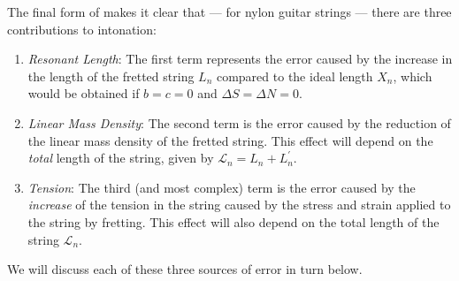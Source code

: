 The final form of  makes it clear that --- for nylon guitar strings --- there are three contributions to intonation:
 \begin{enumerate}
  \item
   \emph{Resonant Length}: The first term represents the error caused by the increase in the length of the fretted string $L_n$ compared to the ideal length $X_n$, which would be obtained if $b = c = 0$ and $\Delta S = \Delta N = 0$.
  \item
   \emph{Linear Mass Density}: The second term is the error caused by the reduction of the linear mass density of the fretted string. This effect will depend on the \emph{total} length of the string, given by $\mathcal{L}_n = L_n + L^\prime_n$.
  \item
   \emph{Tension}: The third (and most complex) term is the error caused by the \emph{increase} of the tension in the string caused by the stress and strain applied to the string by fretting. This effect will also depend on the total length of the string $\mathcal{L}_n$.
 \end{enumerate}
We will discuss each of these three sources of error in turn below.


